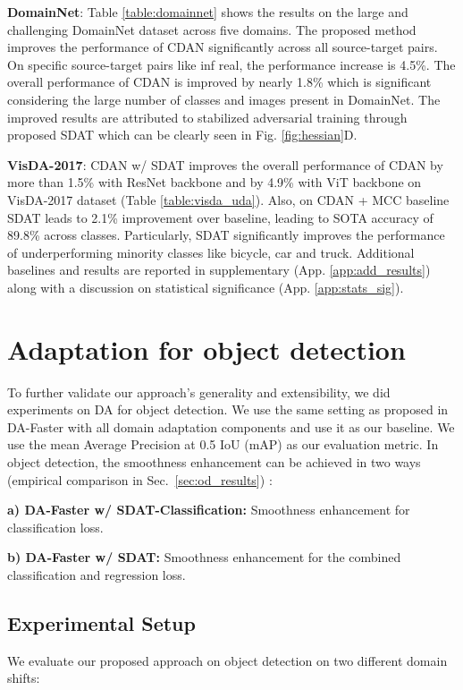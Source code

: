 \documentclass[table,dvipsnames]{article}
\theoremstyle{plain}
\theoremstyle{definition}
\theoremstyle{remark}
\begin{document}
\textbf{DomainNet}: Table \ref{table:domainnet} shows the results on the large and challenging DomainNet dataset across five domains. The proposed method improves the performance of CDAN significantly across all source-target pairs. On specific source-target pairs like inf  real, the performance increase is 4.5\%. The overall performance of CDAN is improved by nearly 1.8\% which is significant considering the large number of classes and images present in DomainNet. The improved results are attributed to stabilized adversarial training through proposed SDAT which can be clearly seen in Fig. \ref{fig:hessian}\textcolor{mydarkblue}{D}.

\textbf{VisDA-2017}: CDAN w/ SDAT improves the overall performance of CDAN by more than 1.5\% with ResNet backbone and by 4.9\% with ViT backbone on VisDA-2017 dataset (Table \ref{table:visda_uda}). Also, on CDAN + MCC baseline SDAT leads to 2.1\% improvement over baseline, leading to SOTA accuracy of 89.8\% across classes.  Particularly, SDAT significantly improves the performance of underperforming minority classes like bicycle, car and truck.  Additional baselines and results are reported in supplementary (App. \ref{app:add_results}) {along with a discussion on statistical significance (App. \ref{app:stats_sig})}.






\section{Adaptation for object detection}
To further validate our approach's generality and extensibility, we did experiments on DA for object detection. We use the same setting as proposed in DA-Faster \citep{chen2018domaindafaster} with all domain adaptation components and use it as our baseline. We use the mean Average Precision at 0.5 IoU (mAP) as our evaluation metric. In object detection, the smoothness enhancement can be achieved in two ways (empirical comparison in Sec.~\ref{sec:od_results}) :

\textbf{a) DA-Faster w/ SDAT-Classification:} Smoothness enhancement for classification loss.

\textbf{b) DA-Faster w/ SDAT:} Smoothness enhancement for the combined classification and regression loss.
\subsection{Experimental Setup}
We evaluate our proposed approach on object detection on two different domain shifts:
\end{document}
